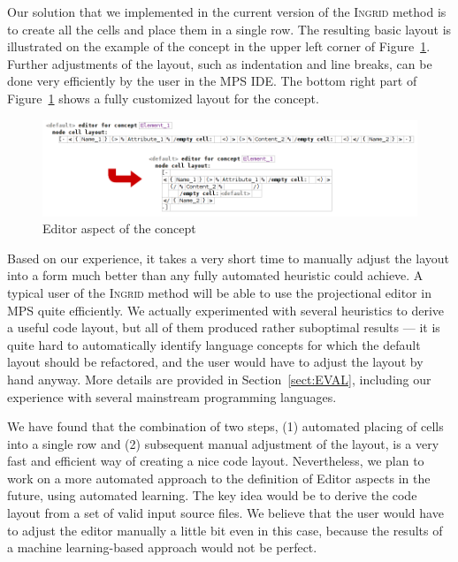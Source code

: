 Our solution that we implemented in the current version of the \textsc{Ingrid} method is to create all the cells and place them in a single row.
The resulting basic layout is illustrated on the example of the  concept in the upper left corner of Figure~\ref{fig:EDITORADJUST}.
Further adjustments of the layout, such as indentation and line breaks, can be done very efficiently by the user in the MPS IDE.
The bottom right part of Figure~\ref{fig:EDITORADJUST} shows a fully customized layout for the  concept.

\begin{figure}[ht]
	\centering
	\includegraphics[scale=0.55]{./images/editor_adjustment.png}
	\caption{Editor aspect of the  concept}
	\label{fig:EDITORADJUST}
\end{figure}

Based on our experience, it takes a very short time to manually adjust the layout into a form much better than any fully automated heuristic could achieve.
A typical user of the \textsc{Ingrid} method will be able to use the projectional editor in MPS quite efficiently.
We actually experimented with several heuristics to derive a useful code layout, but all of them produced rather suboptimal results --- it is quite hard to automatically identify language concepts for which the default layout should be refactored, and the user would have to adjust the layout by hand anyway.
More details are provided in Section~\ref{sect:EVAL}, including our experience with several mainstream programming languages.

We have found that the combination of two steps, (1) automated placing of cells into a single row and (2) subsequent manual adjustment of the layout, is a very fast and efficient way of creating a nice code layout.
Nevertheless, we plan to work on a more automated approach to the definition of Editor aspects in the future, using automated learning.
The key idea would be to derive the code layout from a set of valid input source files.
We believe that the user would have to adjust the editor manually a little bit even in this case, because the results of a machine learning-based approach would not be perfect.

